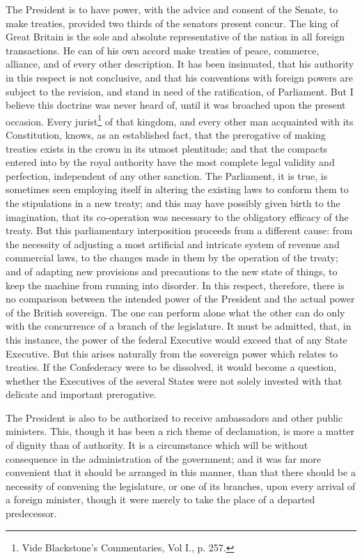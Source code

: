 The President is to have power, with the advice and consent of the Senate, to make treaties, provided two thirds of the senators present concur. The king of Great Britain is the sole and absolute representative of the nation in all foreign transactions. He can of his own accord make treaties of peace, commerce, alliance, and of every other description. It has been insinuated, that his authority in this respect is not conclusive, and that his conventions with foreign powers are subject to the revision, and stand in need of the ratification, of Parliament. But I believe this doctrine was never heard of, until it was broached upon the present occasion. Every jurist\footnote{Vide Blackstone's Commentaries, Vol I., p. 257.} of that kingdom, and every other man acquainted with its Constitution, knows, as an established fact, that the prerogative of making treaties exists in the crown in its utmost plentitude; and that the compacts entered into by the royal authority have the most complete legal validity and perfection, independent of any other sanction. The Parliament, it is true, is sometimes seen employing itself in altering the existing laws to conform them to the stipulations in a new treaty; and this may have possibly given birth to the imagination, that its co-operation was necessary to the obligatory efficacy of the treaty. But this parliamentary interposition proceeds from a different cause: from the necessity of adjusting a most artificial and intricate system of revenue and commercial laws, to the changes made in them by the operation of the treaty; and of adapting new provisions and precautions to the new state of things, to keep the machine from running into disorder. In this respect, therefore, there is no comparison between the intended power of the President and the actual power of the British sovereign. The one can perform alone what the other can do only with the concurrence of a branch of the legislature. It must be admitted, that, in this instance, the power of the federal Executive would exceed that of any State Executive. But this arises naturally from the sovereign power which relates to treaties. If the Confederacy were to be dissolved, it would become a question, whether the Executives of the several States were not solely invested with that delicate and important prerogative.

The President is also to be authorized to receive ambassadors and other public ministers. This, though it has been a rich theme of declamation, is more a matter of dignity than of authority. It is a circumstance which will be without consequence in the administration of the government; and it was far more convenient that it should be arranged in this manner, than that there should be a necessity of convening the legislature, or one of its branches, upon every arrival of a foreign minister, though it were merely to take the place of a departed predecessor.

